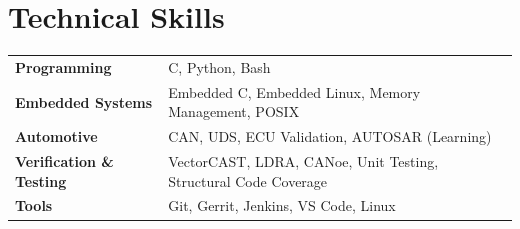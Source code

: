 \section{Technical Skills}

\begin{tabular}{p{3.2cm} p{13cm}}

\textbf{Programming} &
C, Python, Bash \\

\textbf{Embedded Systems} &
Embedded C, Embedded Linux, Memory Management, POSIX \\

\textbf{Automotive} &
CAN, UDS, ECU Validation, AUTOSAR (Learning) \\

\textbf{Verification \& Testing} &
VectorCAST, LDRA, CANoe, Unit Testing, Structural Code Coverage \\

\textbf{Tools} &
Git, Gerrit, Jenkins, VS Code, Linux \\

\end{tabular}